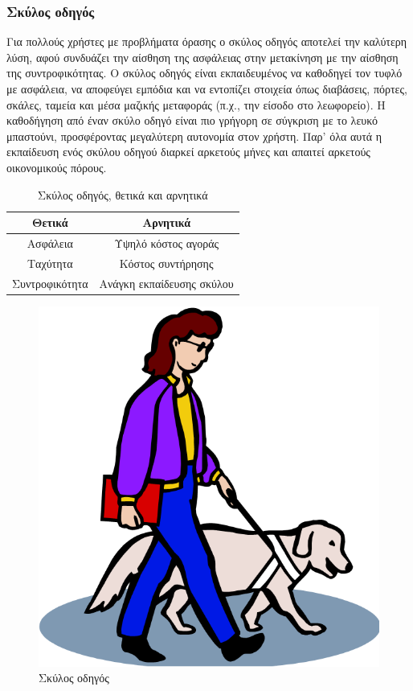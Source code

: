 \subsubsection{Σκύλος οδηγός}
Για πολλούς χρήστες με προβλήματα όρασης ο σκύλος οδηγός αποτελεί την καλύτερη λύση, αφού συνδυάζει την αίσθηση της ασφάλειας στην μετακίνηση με την αίσθηση της συντροφικότητας. Ο σκύλος οδηγός είναι εκπαιδευμένος να καθοδηγεί τον τυφλό με ασφάλεια, να αποφεύγει εμπόδια και να εντοπίζει στοιχεία όπως διαβάσεις, πόρτες, σκάλες, ταμεία και μέσα μαζικής μεταφοράς (π.χ., την είσοδο στο λεωφορείο). Η καθοδήγηση από έναν σκύλο οδηγό είναι πιο γρήγορη σε σύγκριση με το λευκό μπαστούνι, προσφέροντας μεγαλύτερη αυτονομία στον χρήστη. Παρ' όλα αυτά η εκπαίδευση ενός σκύλου οδηγού διαρκεί αρκετούς μήνες και απαιτεί αρκετούς οικονομικούς πόρους.
\begin{table}[H]
    \centering
    \begin{tabular}{|c|c|}
        \hline
        Θετικά & Αρνητικά \\
        \hline
        \hline
        Ασφάλεια & Υψηλό κόστος αγοράς\\
        Ταχύτητα & Κόστος συντήρησης\\
        Συντροφικότητα & Ανάγκη εκπαίδευσης σκύλου\\ 
        \hline
    \end{tabular}
    \caption{Σκύλος οδηγός, θετικά και αρνητικά}
    \label{tab:guide-dog}
\end{table}
\begin{figure}[h]
    \centering
    \includegraphics{images/guide_dog.png}
    \caption{Σκύλος οδηγός}
    \label{fig:guide-dog}
\end{figure}


